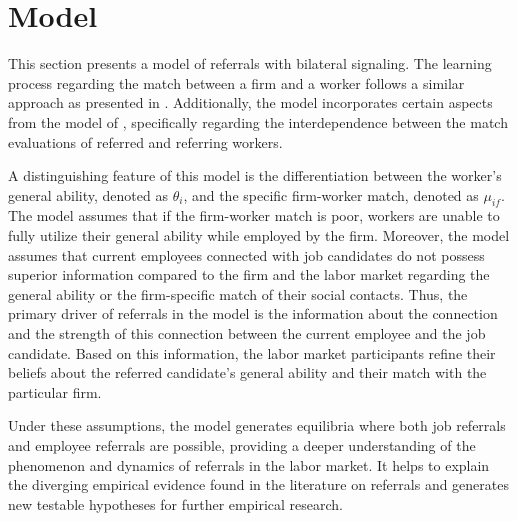 \documentclass[12pt]{article}
\begin{document}

\section{Model} \label{sec:model}

This section presents a model of referrals with bilateral signaling. The learning process regarding the match between a firm and a worker follows a similar approach as presented in \cite{gibbons1999theory, gibbons2006enriching}. Additionally, the model incorporates certain aspects from the model of \cite{ekinci2016employee}, specifically regarding the interdependence between the match evaluations of referred and referring workers.

A distinguishing feature of this model is the differentiation between the worker's general ability, denoted as $\theta_i$, and the specific firm-worker match, denoted as $\mu_{if}$. The model assumes that if the firm-worker match is poor, workers are unable to fully utilize their general ability while employed by the firm. Moreover, the model assumes that current employees connected with job candidates do not possess superior information compared to the firm and the labor market regarding the general ability or the firm-specific match of their social contacts. Thus, the primary driver of referrals in the model is the information about the connection and the strength of this connection between the current employee and the job candidate. Based on this information, the labor market participants refine their beliefs about the referred candidate's general ability and their match with the particular firm.

Under these assumptions, the model generates equilibria where both job referrals and employee referrals are possible, providing a deeper understanding of the phenomenon and dynamics of referrals in the labor market. It helps to explain the diverging empirical evidence found in the literature on referrals and generates new testable hypotheses for further empirical research.
\end{document}
